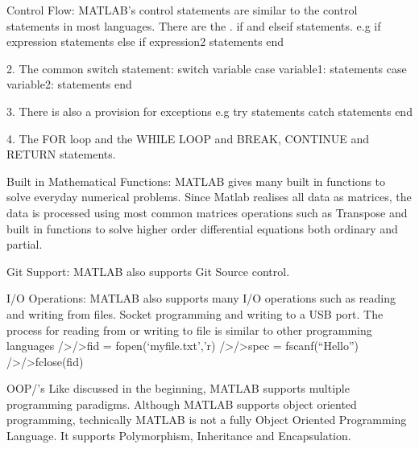 \documentclass[fleqn,letterpaper,12pt]{report}
\begin{document}
Control Flow:\newline
MATLAB’s control statements are similar to the control statements in most languages. There are the . if and elseif statements.\newline
e.g\newline
if expression\newline
	statements\newline
else if expression2\newline
	statements\newline
end

2. The common switch statement:
switch variable\newline
case variable1:\newline
	statements\newline
case variable2:\newline
	statements\newline
end

3. There is also a provision for exceptions
e.g\newline
try \newline
	statements\newline
catch\newline
	statements\newline
end

4. The FOR loop and the WHILE LOOP and BREAK, CONTINUE and RETURN statements.

Built in Mathematical Functions:\newline
MATLAB gives many built in functions to solve everyday numerical problems. Since Matlab realises all data as matrices, the data is processed using most common matrices operations such as Transpose and built in functions to solve higher order differential equations both ordinary and partial.

Git Support:\newline
MATLAB also supports Git Source control. 

I/O Operations:\newline
MATLAB also supports many I/O operations such as reading and writing from files. Socket programming and writing to a USB port.
The process for reading from or writing to  file is similar to other programming languages
/>/>fid = fopen(‘myfile.txt’,’r) %
/>/>spec = fscanf(“Hello”) %
/>/>fclose(fid) %

OOP/’s\newline
Like discussed in the beginning, MATLAB supports multiple programming paradigms. Although MATLAB supports object oriented programming, technically MATLAB is not a fully Object Oriented Programming Language.
It supports Polymorphism, Inheritance and Encapsulation.
\end{document}
